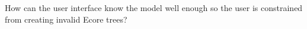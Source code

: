 How can the user interface know the model well enough so the user is constrained from creating invalid Ecore trees?